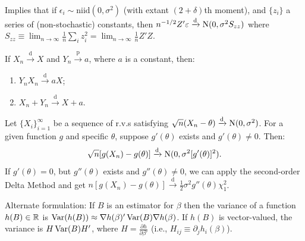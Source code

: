 \documentclass[8pt,letterpaper, landscape]{extarticle} %
\begin{document}
\begin{multicols}{3}
\begin{description}
Implies that if $ \epsilon_i \sim \text{niid} (0 , \sigma^2) $ (with extant $ (2 + \delta ) $th moment), and $ \{ z_i \} $ a series of (non-stochastic) constants, then $ n^{-1/2} Z' \varepsilon \xrightarrow{\text{d}} \operatorname{N} (0 , \sigma^2 S_{zz} ) $ where $ S_{zz} \equiv \lim_{n \to \infty} \tfrac{1}{n} \sum_{i} z_i^2 = \lim_{n \to \infty} \tfrac{1}{n} Z' Z $.

 If $ X_n \xrightarrow{\text{d}} X $ and $ Y_n \xrightarrow{\text{p}} a $, where $ a $ is a constant, then:
\begin{enumerate}
\item $ Y_n X_n \xrightarrow{\text{d}} aX $;
\item $ X_n + Y_n \xrightarrow{\text{d}} X + a $.
\end{enumerate}

Let $ \{ X_i \}_{i=1}^{\infty} $ be a sequence of r.v.s satisfying $ \sqrt{n} (X_n - \theta) \xrightarrow{\text{d}} \operatorname{N} (0, \sigma^2) $. For a given function $ g $ and specific $ \theta $, suppose $ g'(\theta) $ exists and $ g'(\theta) \neq 0 $. Then:
$$ \sqrt{n} [g(X_n) - g(\theta )] \xrightarrow{\text{d}} \operatorname{N} (0, \sigma^2 [g' (\theta)]^2). $$
If $ g'(\theta) = 0 $, but $ g''(\theta) $ exists and $ g''(\theta) \neq 0 $, we can apply the second-order Delta Method and get 
$ n [g(X_n) - g(\theta )] \xrightarrow{\text{d}} \tfrac{1}{2} \sigma^2 g''(\theta) \chi^2_1 $.

Alternate formulation: If $ B $ is an estimator for $ \beta $ then the variance of a function $ h(B) \in \mathbb{R} $ is $ \operatorname{Var} (h(B)) \approx \nabla h(\beta)' \operatorname{Var} (B) \nabla h(\beta) $. If $ h(B) $ is vector-valued, the variance is $ H \operatorname{Var} (B) H' $, where $ H = \frac{\partial h}{\partial \beta'} $ (i.e., $ H_{ij} \equiv \partial_{j} h_{i} (\beta)  $).


\end{description}
\end{multicols}
\end{document}
